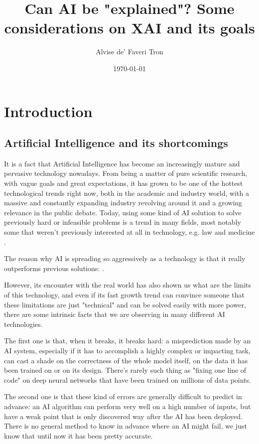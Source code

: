 \documentclass{article}
\title{Can AI be "explained"? Some considerations on XAI and its goals}
\author{Alvise de' Faveri Tron}
\date{\today}
\newcommand{\note}{\todo[tickmarkheight=0.2cm]}
\begin{document}
\maketitle

\tableofcontents

\section{Introduction}

\subsection{Artificial Intelligence and its shortcomings}

It is a fact that Artificial Intelligence has become an increasingly mature and
pervasive technology nowadays. From being a matter of pure scientific research,
with vague goals and great expectations, it has grown to be one of the hottest
technological trends \note{cit} right now, both in the academic and industry world, with a massive and constantly expanding industry revolving
around it \note{cit} and a growing relevance in the public debate. Today, using some kind of
AI solution to solve previously hard or infeasible problems is a trend in many fields, most notably some that weren't previously
interested at all in technology, e.g. law and medicine \note{cit}.

The reason why AI is spreading so aggressively as a technology is that it really outperforms previous solutions: \note{examples}.

However, its encounter with the real world has also shown us what are the limits of this technology, and even if its fast growth trend can convince someone that these limitations are just "technical" and can be solved easily with more power, there are some intrinsic facts that we are observing in many different AI technologies.

The first one is that, when it breaks, it breaks hard: a misprediction made by an AI system, especially if it has to accomplish a highly complex or impacting task, can cast a shade on the correctness of the whole model itself, on the data it has been trained on or on its design. There's rarely such thing as "fixing one line of code" on deep neural networks that have been trained on millions of data points.

The second one is that these kind of errors are generally difficult to predict in advance: an AI algorithm can perform very well on a high number of inputs, but have a weak point that is only discovered way after the AI has been deployed. There is no general method to know in advance where an AI might fail, we just know that until now it has been pretty accurate.
\end{document}
